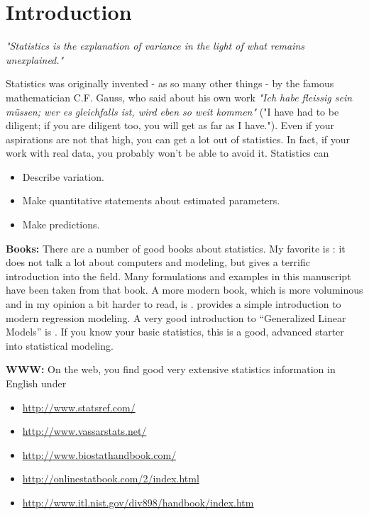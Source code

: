 \chapter{Introduction}

\emph{"Statistics is the explanation of variance in the light of what remains
unexplained."}

\vspace{5 mm}

Statistics was originally invented - as so many other things - by the famous mathematician C.F. Gauss, who said about his own work \emph{"Ich habe fleissig sein m\"ussen; wer es gleichfalls ist, wird eben so weit kommen"} ("I have had to be diligent; if you are diligent too, you will get as far as I have."). Even if your aspirations are not that high, you can get a lot out of statistics. In fact, if your work with real data, you probably won't be able to avoid it. Statistics can

\begin{itemize}
  \item Describe variation.
  \item Make quantitative statements about estimated parameters.
  \item Make predictions.
\end{itemize}

\textbf{Books: }There are a number of good books about statistics. My favorite is \cite{altman99}: it does not talk a lot about computers and modeling, but gives a terrific introduction into the field. Many formulations and examples in this manuscript have been taken from that book. A more modern book, which is more voluminous and in my opinion a bit harder to read, is \cite{Riffenburgh2012}. \cite{Kaplan2009} provides a simple introduction to modern regression modeling. A very good introduction to “Generalized Linear Models” is \cite{Dobson2008}. If you know your basic statistics, this is a good, advanced starter into statistical modeling.

\vspace{5 mm}

\textbf{WWW: }On the web, you find good very extensive statistics information in English under
\begin{itemize}
    \item \url{http://www.statsref.com/}
    \item \url{http://www.vassarstats.net/}
    \item \url{http://www.biostathandbook.com/}
    \item \url{http://onlinestatbook.com/2/index.html}
    \item \url{http://www.itl.nist.gov/div898/handbook/index.htm}
\end{itemize}

